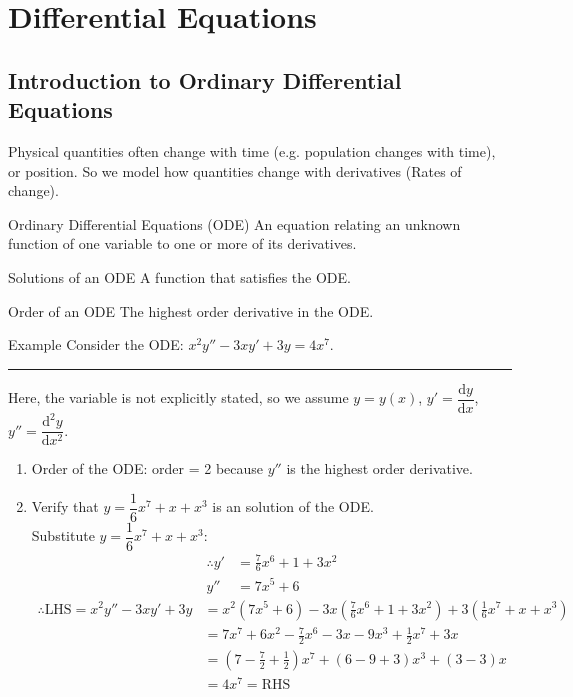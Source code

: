 \documentclass[12pt,a4paper]{article}
\def\d{{\mathrm{d}}}
\begin{document}
\section{Differential Equations}
\subsection{Introduction to Ordinary Differential Equations}
Physical quantities often change with time (e.g. population changes with time), or position. So we model how quantities change with derivatives (Rates of change).
\begin{df}{Ordinary Differential Equations (ODE)}
	An equation relating an unknown function of one variable to one or more of its derivatives. 
\end{df}
\begin{df}{Solutions of an ODE}
	A function that satisfies the ODE.
\end{df}
\begin{df}{Order of an ODE}
	The highest order derivative in the ODE.
\end{df}
\begin{eg}{Example}
	Consider the ODE: $x^2y''-3xy'+3y=4x^7$.\\
	\noindent\rule[0.25\baselineskip]{\textwidth}{1pt}
	Here, the variable is not explicitly stated, so we assume $y=y(x)$, $y'=\dfrac{\d y}{\d x}$, $y''=\dfrac{\d^2 y}{\d x^2}$.
	\begin{enumerate}
		\item Order of the ODE: order = 2 because $y''$ is the highest order derivative. 
		\item Verify that $y=\dfrac{1}{6}x^7+x+x^3$ is an solution of the ODE.\\ 
		\newline Substitute $y=\dfrac{1}{6}x^7+x+x^3$: 
		$$\begin{aligned}
			\therefore y'&=\frac{7}{6}x^6+1+3x^2\\
			y''&=7x^5+6
		\end{aligned}$$
		$$\begin{aligned}
			\therefore \text{LHS}=x^2y''-3x y'+3y&=x^2(7x^5+6)-3x(\frac{7}{6}x^6+1+3x^2)+3(\frac{1}{6}x^7+x+x^3)\\
			&=7x^7+6x^2-\frac{7}{2}x^6-3x-9x^3+\frac{1}{2}x^7+3x\\
			&=\left(7-\frac{7}{2}+\frac{1}{2}\right)x^7+(6-9+3)x^3+(3-3)x\\
			&=4x^7=\text{RHS}
		\end{aligned}$$
	\end{enumerate}
\end{eg}
\end{document}
